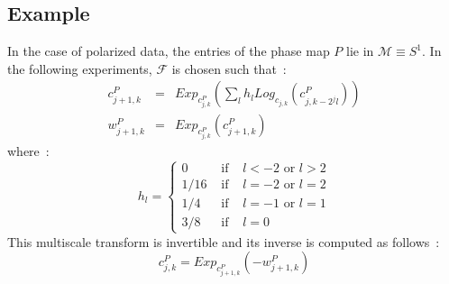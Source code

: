 \subsection{Example}
In the case of polarized data, the entries of the phase map $P$ lie in $\mathcal{M} \equiv S^1$. In the following experiments, $\mathcal{F}$ is chosen such that~:
\begin{eqnarray}
c_{j+1,k}^P & = & Exp_{c_{j,k}^P}\left(\sum_l h_{l}Log_{c_{j,k}}\left(c_{j,k-2^jl}^P\right)\right)  \\
w_{j+1,k}^P & = & Exp_{c_{j,k}^P} \left(c_{j+1,k}^P\right)
\end{eqnarray}
where~:
\begin{equation}
h_l = \left\{
\begin{array}{ccc}
0 & \mbox{ if } & l < -2 \mbox{ or } l > 2 \\
1/16 &\mbox{ if }& l=-2 \mbox{ or } l=2 \\
1/4 &\mbox{ if }& l=-1 \mbox{ or } l=1\\
3/8 &\mbox{ if }& l= 0
\end{array}
\right.
\end{equation}
This multiscale transform is invertible and its inverse is computed as follows~:
\begin{equation}
 c_{j,k}^P  =  Exp_{c_{j+1,k}^P } \left(- w_{j+1,k}^P\right)  
\end{equation}

